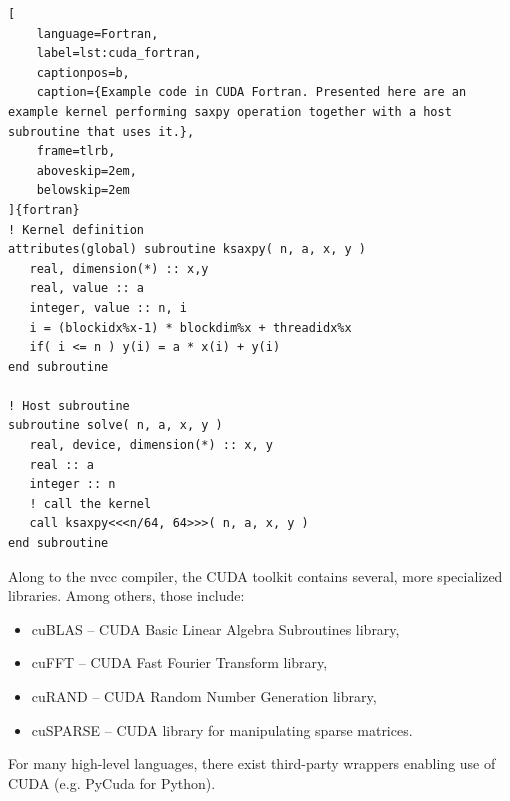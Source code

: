 \begin{lstlisting}[
    language=Fortran,
    label=lst:cuda_fortran,
    captionpos=b,
    caption={Example code in CUDA Fortran. Presented here are an example kernel performing saxpy operation together with a host subroutine that uses it.},
    frame=tlrb,
    aboveskip=2em,
    belowskip=2em
]{fortran}
! Kernel definition
attributes(global) subroutine ksaxpy( n, a, x, y )
   real, dimension(*) :: x,y
   real, value :: a
   integer, value :: n, i
   i = (blockidx%x-1) * blockdim%x + threadidx%x
   if( i <= n ) y(i) = a * x(i) + y(i)
end subroutine

! Host subroutine
subroutine solve( n, a, x, y )
   real, device, dimension(*) :: x, y
   real :: a
   integer :: n
   ! call the kernel
   call ksaxpy<<<n/64, 64>>>( n, a, x, y )
end subroutine
\end{lstlisting}

Along to the nvcc compiler, the CUDA toolkit contains several, more specialized libraries. Among others, those include:
\begin{itemize}
    \item cuBLAS -- CUDA Basic Linear Algebra Subroutines library,
    \item cuFFT -- CUDA Fast Fourier Transform library,
    \item cuRAND -- CUDA Random Number Generation library,
    \item cuSPARSE -- CUDA library for manipulating sparse matrices.
\end{itemize}
For many high-level languages, there exist third-party wrappers enabling use of CUDA (e.g. PyCuda for Python).



